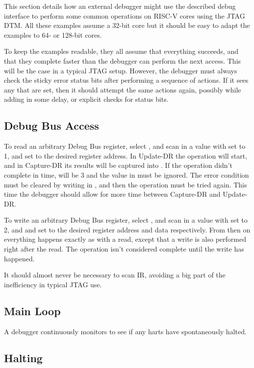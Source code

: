 \documentclass{article}
\begin{document}
This section details how an external debugger might use the described debug
interface to perform some common operations on RISC-V cores using the JTAG DTM.
All these examples assume a 32-bit core but it should be easy to adapt the
examples to 64- or 128-bit cores.

To keep the examples readable, they all assume that everything succeeds, and
that they complete faster than the debugger can perform the next access. This
will be the case in a typical JTAG setup. However, the debugger must always
check the sticky error status bits after performing a sequence of actions. If
it sees any that are set, then it should attempt the same actions again,
possibly while adding in some delay, or explicit checks for status bits.

\subsection{Debug Bus Access} \label{dbusaccess}

To read an arbitrary Debug Bus register, select \Rdbus, and scan in a value
with \Fop set to 1, and \Faddress set to the desired register address. In
Update-DR the operation will start, and in Capture-DR its results will be
captured into \Fdata.  If the operation didn't complete in time, \Fop will be 3
and the value in \Fdata must be ignored. The error condition must be cleared by
writing \Fdbusreset in \Rdtmcontrol, and then the operation must be tried
again. This time the debugger should allow for more time between Capture-DR and
Update-DR.

To write an arbitrary Debug Bus register, select \Rdbus, and scan in a value
with \Fop set to 2, and \Faddress and \Fdata set to the desired register
address and data respectively. From then on everything happens exactly as with
a read, except that a write is also performed right after the read. The
operation isn't considered complete until the write has happened.

It should almost never be necessary to scan IR, avoiding a big part of the
inefficiency in typical JTAG use.

\subsection{Main Loop}

A debugger continuously monitors \Rhaltsum to see if any harts have spontaneously
halted.

\subsection{Halting}
\end{document}
